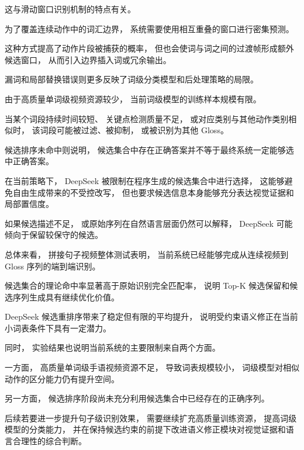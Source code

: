 这与滑动窗口识别机制的特点有关。

为了覆盖连续动作中的词汇边界，
系统需要使用相互重叠的窗口进行密集预测。

这种方式提高了动作片段被捕获的概率，
但也会使词与词之间的过渡帧形成额外候选窗口，
从而引入边界插入词或冗余输出。

漏词和局部替换错误则更多反映了词级分类模型和后处理策略的局限。

由于高质量单词级视频资源较少，
当前词级模型的训练样本规模有限。

当某个词段持续时间较短、
关键点检测质量不足，
或对应类别与其他动作类别相似时，
该词段可能被过滤、被抑制，
或被识别为其他 Gloss。

候选排序未命中则说明，
候选集合中存在正确答案并不等于最终系统一定能够选中正确答案。

在当前策略下，
DeepSeek 被限制在程序生成的候选集合中进行选择，
这能够避免自由生成带来的不受控改写，
但也要求候选信息本身能够充分表达视觉证据和局部置信度。

如果候选描述不足，
或原始序列在自然语言层面仍然可以解释，
DeepSeek 可能倾向于保留较保守的候选。

总体来看，
拼接句子视频整体测试表明，
当前系统已经能够完成从连续视频到 Gloss 序列的端到端识别。

候选集合的理论命中率显著高于原始识别完全匹配率，
说明 Top-K 候选保留和候选序列生成具有继续优化价值。

DeepSeek 候选重排序带来了稳定但有限的平均提升，
说明受约束语义修正在当前小词表条件下具有一定潜力。

同时，
实验结果也说明当前系统的主要限制来自两个方面。

一方面，
高质量单词级手语视频资源不足，
导致词表规模较小，
词级模型对相似动作的区分能力仍有提升空间。

另一方面，
候选排序阶段尚未充分利用候选集合中已经存在的正确序列。

后续若要进一步提升句子级识别效果，
需要继续扩充高质量训练资源，
提高词级模型的分类能力，
并在保持候选约束的前提下改进语义修正模块对视觉证据和语言合理性的综合判断。